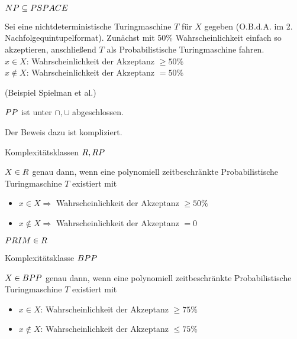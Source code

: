 \begin{satz}
    $NP \subseteq PSPACE$
\end{satz}
\begin{beweis}
    Sei eine nichtdeterministische Turingmaschine $T$ für $X$ gegeben
    (O.B.d.A. im 2. Nachfolgequintupelformat).
    Zunächst mit 50\% Wahrscheinlichkeit einfach so akzeptieren,
    anschließend $T$ als Probabilistische Turingmaschine fahren.
    \\
    $x \in X$: Wahrscheinlichkeit der Akzeptanz $\geq 50\%$
    \\
    $x \notin X$: Wahrscheinlichkeit der Akzeptanz $= 50\%$
\end{beweis}

\begin{satz}
    (Beispiel Spielman et al.)

    $PP$ ist unter $\cap, \cup$ abgeschlossen.
\end{satz}
Der Beweis dazu ist kompliziert.



\begin{definition}
    Komplexitätsklassen $R, RP$

    $X \in R$ genau dann, wenn eine polynomiell zeitbeschränkte Probabilistische Turingmaschine $T$ existiert mit
    \begin{itemize}
        \item $x \in X \Rightarrow$ Wahrscheinlichkeit der Akzeptanz $\geq 50\%$
        \item $x \notin X \Rightarrow$ Wahrscheinlichkeit der Akzeptanz $= 0$
    \end{itemize}
\end{definition}

\begin{beispiel}
    $PRIM \in R$
\end{beispiel}


\begin{definition}
    Komplexitätsklasse $BPP$

    $X \in BPP$ genau dann, wenn eine polynomiell zeitbeschränkte Probabilistische Turingmaschine $T$ existiert mit
    \begin{itemize}
        \item $x \in X $: Wahrscheinlichkeit der Akzeptanz $\geq 75\%$
        \item $x \notin X $: Wahrscheinlichkeit der Akzeptanz $\leq 75\%$
    \end{itemize}
\end{definition}

